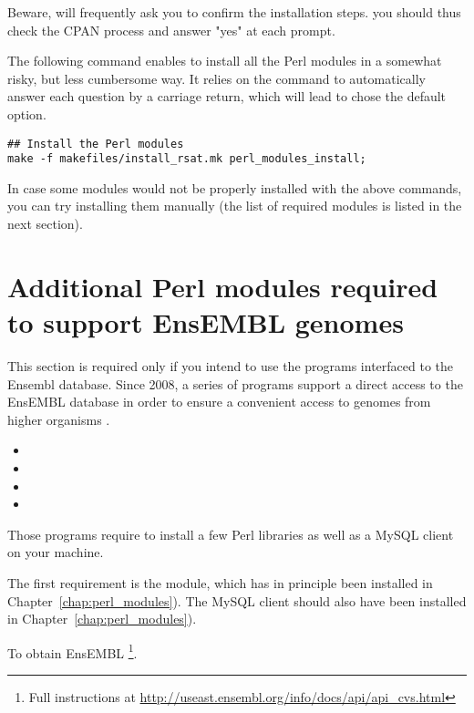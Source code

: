 \documentclass[12pt,a4paper, oneside]{scrreprt} %
\begin{document}
Beware,  will frequently ask you to confirm the
installation steps. you should thus check the CPAN process and answer
"yes" at each prompt.

The following command enables to install all the Perl modules in a
somewhat risky, but less cumbersome way. It relies on the command
 to automatically answer each question by a carriage
return, which will lead  to chose the default option.

\begin{lstlisting}
## Install the Perl modules
make -f makefiles/install_rsat.mk perl_modules_install;
\end{lstlisting}

In case some modules would not be properly installed with the above
commands, you can try installing them manually (the list of required
modules is listed in the next section).


\section{Additional Perl modules required to support EnsEMBL genomes}
\label{sect:ensembl_libraries}

This section is required only if you intend to use the \RSAT programs
interfaced to the Ensembl database.  Since 2008, a series of \RSAT
programs support a direct access to the EnsEMBL database in order to
ensure a convenient access to genomes from higher organisms
\cite{Sand:2009}.

\begin{itemize}
\item {}
\item {}
\item {} 
\item {}
\end{itemize}

Those programs require to install a few Perl libraries as well as a
MySQL client on your machine.

The first requirement is the  module, which has in
principle been installed in Chapter~\ref{chap:perl_modules}). The
MySQL client should also have been installed in
Chapter~\ref{chap:perl_modules}).

To obtain EnsEMBL \footnote{Full instructions at
  \url{http://useast.ensembl.org/info/docs/api/api_cvs.html}}.
\end{document}

